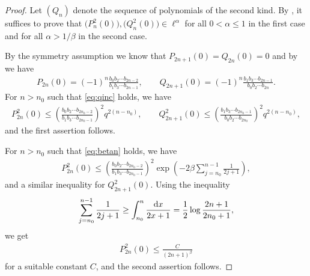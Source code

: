 \begin{proof} Let $(Q_n)$ denote the sequence of polynomials of the second kind. By \cite[Theorem~1.2]{B:S2}, it suffices to prove that $\big(P_n^2(0)\big), \big(Q_n^2(0)\big)\in\ell^\alpha$ for all $0<\alpha\le 1$ in the first case and for all $\alpha>1/\beta$ in the second case.

 By the symmetry assumption we know that $P_{2n+1}(0)=Q_{2n}(0)=0$ and by \cite[Remark 4.5]{B:S2} we have
\begin{gather}\label{eq:P2n(0)}
P_{2n}(0)=(-1)^n\frac{b_0b_2\cdots b_{2n-2}}{b_1b_3\cdots b_{2n-1}},\qquad Q_{2n+1}(0)=(-1)^n\frac{b_1b_3\cdots b_{2n-1}}{b_0b_2\cdots b_{2n}}.
\end{gather}
For $n>n_0$ such that \eqref{eq:qinc} holds, we have
\begin{gather*}
P_{2n}^2(0)\le \left(\frac{b_0b_2\cdots b_{2n_0-2}}{b_1b_3\cdots b_{2n_0-1}}\right)^2q^{2(n-n_0)},\qquad
Q_{2n+1}^2(0)\le \left(\frac{b_1b_3\cdots b_{2n_0-1}}{b_0b_2\cdots b_{2n_0}}\right)^2 q^{2(n-n_0)},
\end{gather*}
and the first assertion follows.

For $n>n_0$ such that \eqref{eq:betan} holds, we have
\begin{gather*}
P_{2n}^2(0)\le \left(\frac{b_0b_2\cdots b_{2n_0-2}}{b_1b_3\cdots b_{2n_0-1}}\right)^2\exp\left(-2\beta\sum_{j=n_0}^{n-1}\frac{1}{2j+1}\right),
\end{gather*}
and a similar inequality for $Q_{2n+1}^2(0)$. Using the inequality
\begin{gather*}
\sum_{j=n_0}^{n-1}\frac{1}{2j+1}\ge \int_{n_0}^n\frac{{\rm d}x}{2x+1}=\frac12\log\frac{2n+1}{2n_0+1},
\end{gather*}
we get
\begin{gather*}
P_{2n}^2(0)\le \frac{C}{(2n+1)^\beta}
\end{gather*}
for a suitable constant $C$, and the second assertion follows.
\end{proof}
